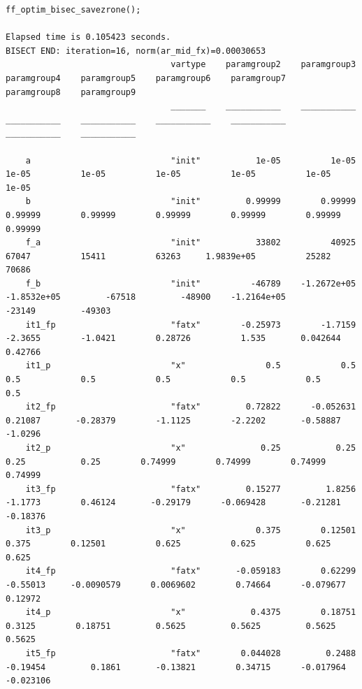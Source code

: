 \documentclass[
]{book}
\begin{document}
\begin{verbatim}
ff_optim_bisec_savezrone();

Elapsed time is 0.105423 seconds.
BISECT END: iteration=16, norm(ar_mid_fx)=0.00030653
                                 vartype    paramgroup2    paramgroup3    paramgroup4    paramgroup5    paramgroup6    paramgroup7    paramgroup8    paramgroup9
                                 _______    ___________    ___________    ___________    ___________    ___________    ___________    ___________    ___________

    a                            "init"           1e-05          1e-05          1e-05          1e-05          1e-05          1e-05          1e-05          1e-05
    b                            "init"         0.99999        0.99999        0.99999        0.99999        0.99999        0.99999        0.99999        0.99999
    f_a                          "init"           33802          40925          67047          15411          63263     1.9839e+05          25282          70686
    f_b                          "init"          -46789    -1.2672e+05    -1.8532e+05         -67518         -48900    -1.2164e+05         -23149         -49303
    it1_fp                       "fatx"        -0.25973        -1.7159        -2.3655        -1.0421        0.28726          1.535       0.042644        0.42766
    it1_p                        "x"                0.5            0.5            0.5            0.5            0.5            0.5            0.5            0.5
    it2_fp                       "fatx"         0.72822      -0.052631        0.21087       -0.28379        -1.1125        -2.2202       -0.58887        -1.0296
    it2_p                        "x"               0.25           0.25           0.25           0.25        0.74999        0.74999        0.74999        0.74999
    it3_fp                       "fatx"         0.15277         1.8256        -1.1773        0.46124       -0.29179      -0.069428       -0.21281       -0.18376
    it3_p                        "x"              0.375        0.12501          0.375        0.12501          0.625          0.625          0.625          0.625
    it4_fp                       "fatx"       -0.059183        0.62299       -0.55013     -0.0090579      0.0069602        0.74664      -0.079677        0.12972
    it4_p                        "x"             0.4375        0.18751         0.3125        0.18751         0.5625         0.5625         0.5625         0.5625
    it5_fp                       "fatx"        0.044028         0.2488       -0.19454         0.1861       -0.13821        0.34715      -0.017964      -0.023106

\end{verbatim}
\end{document}
